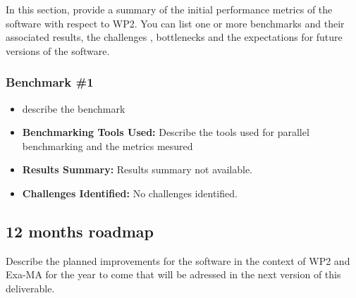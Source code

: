 In this section, provide a summary of the initial performance metrics of the software with respect to WP2.
You can list one or more benchmarks and their associated results, the challenges , bottlenecks and the expectations for future versions of the software.



\subsubsection{Benchmark \#1}
\begin{itemize}
    \item describe the benchmark
    \item \textbf{Benchmarking Tools Used:} Describe the tools used for parallel benchmarking and the metrics mesured
    \item \textbf{Results Summary:} Results summary not available.
    \item \textbf{Challenges Identified:} No challenges identified.
\end{itemize}

\subsection{12 months roadmap}
\label{sec:WP2:FreeFem++:roadmap}

Describe the planned improvements  for the software in the context of WP2 and Exa-MA for the year to come that will be adressed in the next version of this deliverable.